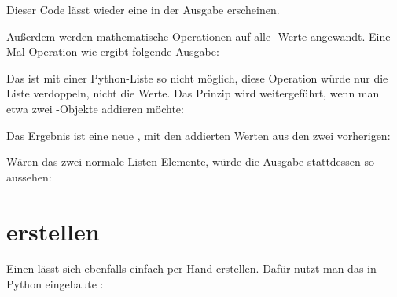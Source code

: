 

\medskip

Dieser Code lässt wieder eine  in der Ausgabe erscheinen.

Außerdem werden mathematische Operationen auf alle -Werte angewandt. Eine Mal-Operation wie  ergibt folgende Ausgabe:

\medskip





\medskip

Das ist mit einer Python-Liste so nicht möglich, diese Operation würde nur die Liste verdoppeln, nicht die Werte. Das Prinzip wird weitergeführt, wenn man etwa zwei -Objekte addieren möchte:

\medskip




\medskip

Das Ergebnis ist eine neue , mit den addierten Werten aus den zwei vorherigen:

\medskip




\medskip

Wären das zwei normale Listen-Elemente, würde die Ausgabe stattdessen so aussehen:

\medskip

\PYTHON{[1, 2, 3, 4, 5, 6]}

\section{ erstellen}

Einen  lässt sich ebenfalls einfach per Hand erstellen. Dafür nutzt man das in Python eingebaute :
	
\medskip


